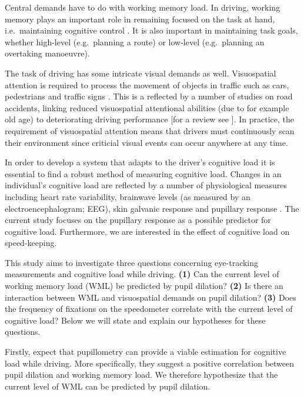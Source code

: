 Central demands have to do with working memory load.
In driving, working memory plays an important role in remaining focused on the task at hand, i.e.\ maintaining cognitive control \citep{Wood2016}.
It is also important in maintaining task goals, whether high-level (e.g.\ planning a route) or low-level (e.g.\ planning an overtaking manoeuvre).

The task of driving has some intricate visual demands as well.
Visuospatial attention is required to process the movement of objects in traffic such as cars, pedestrians and traffic signs \citep{Zheng2020}.
This is a reflected by a number of studies on road accidents, linking reduced visuospatial attentional abilities (due to for example old age) to deteriorating driving performance [for a review see \citet{Owsley2010}].
In practice, the requirement of visuospatial attention means that drivers must continuously scan their environment since criticial visual events can occur anywhere at any time.

In order to develop a system that adapts to the driver's cognitive load it is essential to find a robust method of measuring cognitive load.
Changes in an individual's cognitive load are reflected by a number of physiological measures including heart rate variability, brainwave levels (as measured by an electroencephalogram; EEG), skin galvanic response and pupillary response \citep{Haapalainen2010}.
The current study focuses on the pupillary response as a possible predictor for cognitive load.
Furthermore, we are interested in the effect of cognitive load on speed-keeping.

This study aims to investigate three questions concerning eye-tracking measurements and cognitive load while driving.
\textbf{(1)} Can the current level of working memory load (WML) be predicted by pupil dilation?
\textbf{(2)} Is there an interaction between WML and visuospatial demands on pupil dilation?
\textbf{(3)} Does the frequency of fixations on the speedometer correlate with the current level of cognitive load?
Below we will state and explain our hypotheses for these questions. 

Firstly, \citet{Palinko2010} expect that pupillometry can provide a viable estimation for cognitive load while driving. 
More specifically, they suggest a positive correlation between pupil dilation and working memory load.
We therefore hypothesize that the current level of WML can be predicted by pupil dilation.

